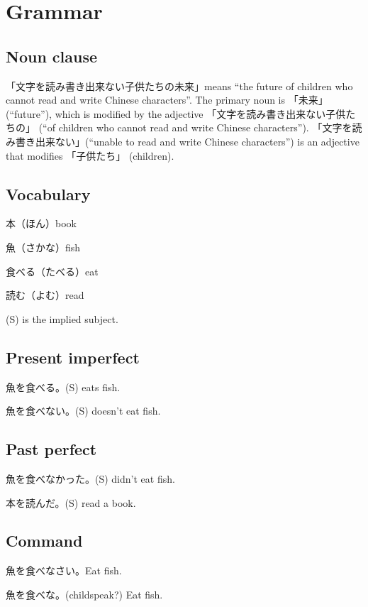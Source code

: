 \chapter{Grammar}


\section{Noun clause}

「文字を読み書き出来ない子供たちの未来」means
``the future of children who cannot read and write Chinese characters''.
The primary noun is 「未来」 (``future''),
which is modified by the adjective
「文字を読み書き出来ない子供たちの」
(``of children who cannot read and write Chinese characters'').
「文字を読み書き出来ない」(``unable to read and write Chinese characters'')
is an adjective that modifies 「子供たち」 (children).

\section{Vocabulary}

本（ほん）book

魚（さかな）fish

食べる（たべる）eat

読む（よむ）read

(S) is the implied subject.

\section{Present imperfect}

魚を食べる。(S) eats fish.

魚を食べない。(S) doesn't eat fish.

\section{Past perfect}

魚を食べなかった。(S) didn't eat fish.

本を読んだ。(S) read a book.

\section{Command}

魚を食べなさい。Eat fish.

魚を食べな。(childspeak?) Eat fish.

